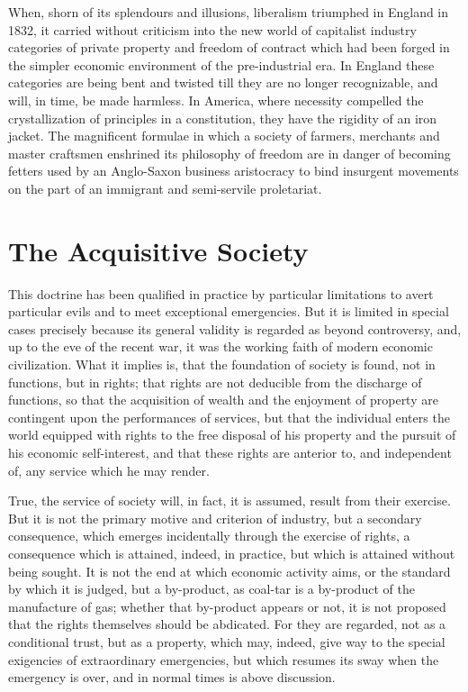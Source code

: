 \documentclass{book}
\begin{document}
When, shorn of its splendours and illusions, liberalism triumphed in England in 1832, it carried without criticism into the new world of capitalist industry categories of private property and freedom of contract which had been forged in the simpler economic environment of the pre-industrial era. In England these categories are being bent and twisted till they are no longer recognizable, and will, in time, be made harmless. In America, where necessity compelled the crystallization of principles in a constitution, they have the rigidity of an iron jacket. The magnificent formulae in which a society of farmers, merchants and master craftsmen enshrined its philosophy of freedom are in danger of becoming fetters used by an Anglo-Saxon business aristocracy to bind insurgent movements on the part of an immigrant and semi-servile proletariat.

\chapter{The Acquisitive Society}
\label{chapter-2}
This doctrine has been qualified in practice by particular limitations to avert particular evils and to meet exceptional emergencies. But it is limited in special cases precisely because its general validity is regarded as beyond controversy, and, up to the eve of the recent war, it was the working faith of modern economic civilization. What it implies is, that the foundation of society is found, not in functions, but in rights; that rights are not deducible from the discharge of functions, so that the acquisition of wealth and the enjoyment of property are contingent upon the performances of services, but that the individual enters the world equipped with rights to the free disposal of his property and the pursuit of his economic self-interest, and that these rights are anterior to, and independent of, any service which he may render.

True, the service of society will, in fact, it is assumed, result from their exercise. But it is not the primary motive and criterion of industry, but a secondary consequence, which emerges incidentally through the exercise of rights, a consequence which is attained, indeed, in practice, but which is attained without being sought. It is not the end at which economic activity aims, or the standard by which it is judged, but a by-product, as coal-tar is a by-product of the manufacture of gas; whether that by-product appears or not, it is not proposed that the rights themselves should be abdicated. For they are regarded, not as a conditional trust, but as a property, which may, indeed, give way to the special exigencies of extraordinary emergencies, but which resumes its sway when the emergency is over, and in normal times is above discussion.
\end{document}
